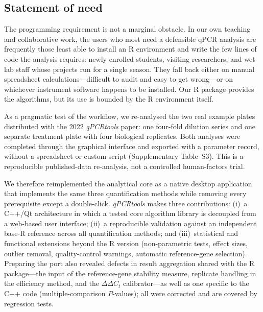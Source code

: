 \subsection*{Statement of need}

The programming requirement is not a marginal obstacle. In our own teaching
and collaborative work, the users who most need a defensible qPCR analysis
are frequently those least able to install an R environment and write the
few lines of code the analysis requires: newly enrolled students, visiting
researchers, and wet-lab staff whose projects run for a single season. They
fall back either on manual spreadsheet calculations---difficult to audit and
easy to get wrong---or on whichever instrument software happens to be
installed. Our R package \cite{li2022qpcrtools} provides the algorithms, but
its use is bounded by the R environment itself.

As a pragmatic test of the workflow, we re-analysed the two real example
plates distributed with the 2022 \textit{qPCRtools} paper: one four-fold
dilution series and one separate treatment plate with four biological
replicates. Both analyses were completed through the graphical interface and
exported with a parameter record, without a spreadsheet or custom script
(Supplementary Table~S3). This is a reproducible published-data re-analysis,
not a controlled human-factors trial.

We therefore reimplemented the analytical core as a native desktop
application that implements the same three quantification methods while
removing every prerequisite except a double-click. \textit{qPCRtools} makes
three contributions: (i)~a C++/Qt architecture in which a tested core
algorithm library is decoupled from a web-based user interface; (ii)~a
reproducible validation against an independent base-R reference across all
quantification methods; and
(iii)~statistical and functional extensions beyond the R version
(non-parametric tests, effect sizes, outlier removal, quality-control
warnings, automatic reference-gene selection). Preparing the port also
revealed defects in result aggregation shared with the R package---the input
of the reference-gene stability measure, replicate handling in the efficiency
method, and the $\Delta\Delta C_t$ calibrator---as well as one specific to the
C++ code (multiple-comparison $P$-values); all were corrected and are covered
by regression tests.
